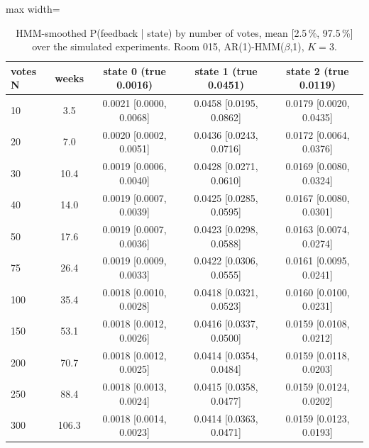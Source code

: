 \begin{table}[ht]
\centering
\begin{adjustbox}{max width=\textwidth}
\begin{tabular}{lcccc}
\hline
votes N & weeks & state 0 (true 0.0016) & state 1 (true 0.0451) & state 2 (true 0.0119) \\
\hline
10 & 3.5 & 0.0021 [0.0000, 0.0068] & 0.0458 [0.0195, 0.0862] & 0.0179 [0.0020, 0.0435] \\
20 & 7.0 & 0.0020 [0.0002, 0.0051] & 0.0436 [0.0243, 0.0716] & 0.0172 [0.0064, 0.0376] \\
30 & 10.4 & 0.0019 [0.0006, 0.0040] & 0.0428 [0.0271, 0.0610] & 0.0169 [0.0080, 0.0324] \\
40 & 14.0 & 0.0019 [0.0007, 0.0039] & 0.0425 [0.0285, 0.0595] & 0.0167 [0.0080, 0.0301] \\
50 & 17.6 & 0.0019 [0.0007, 0.0036] & 0.0423 [0.0298, 0.0588] & 0.0163 [0.0074, 0.0274] \\
75 & 26.4 & 0.0019 [0.0009, 0.0033] & 0.0422 [0.0306, 0.0555] & 0.0161 [0.0095, 0.0241] \\
100 & 35.4 & 0.0018 [0.0010, 0.0028] & 0.0418 [0.0321, 0.0523] & 0.0160 [0.0100, 0.0231] \\
150 & 53.1 & 0.0018 [0.0012, 0.0026] & 0.0416 [0.0337, 0.0500] & 0.0159 [0.0108, 0.0212] \\
200 & 70.7 & 0.0018 [0.0012, 0.0025] & 0.0414 [0.0354, 0.0484] & 0.0159 [0.0118, 0.0203] \\
250 & 88.4 & 0.0018 [0.0013, 0.0024] & 0.0415 [0.0358, 0.0477] & 0.0159 [0.0124, 0.0202] \\
300 & 106.3 & 0.0018 [0.0014, 0.0023] & 0.0414 [0.0363, 0.0471] & 0.0159 [0.0123, 0.0193] \\
\hline
\end{tabular}
\end{adjustbox}
\caption{HMM-smoothed P(feedback | state) by number of votes, mean [2.5\,\%, 97.5\,\%] over the simulated experiments. Room 015, AR(1)-HMM($\beta$,1), $K=3$.}
\label{tab:feedback_p_room_015_ar1_hmm_beta_1_K3}
\end{table}
